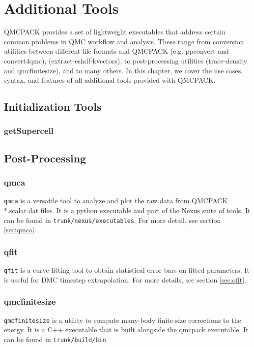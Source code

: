 \chapter{Additional Tools}
\label{chap:additional_tools}
QMCPACK provides a set of lightweight executables that address certain
common problems in QMC workflow and analysis.  These range from conversion utilities between 
different file formats and QMCPACK (e.g. ppconvert and convert4qmc),  
(extract-eshdf-kvectors), to post-processing utilities (trace-density and qmcfinitesize), and to many others.  In this chapter, we cover the use cases, syntax, and features of all additional tools provided with QMCPACK.  

\section{Initialization Tools}
  \subsection{getSupercell}

\section{Post-Processing}
  \subsection{qmca}
    \texttt{qmca} is a versatile tool to analyze and plot the raw data from QMCPACK *.scalar.dat files.
    It is a python executable and part of the Nexus suite of tools.  It can be found in 
    \texttt{trunk/nexus/executables}. For more detail, see section \ref{sec:qmca}.
  \subsection{qfit}
    \texttt{qfit} is a curve fitting tool to obtain statistical error bars on fitted parameters.
    It is useful for DMC timestep extrapolation.  For more details, see section \ref{sec:qfit}.
  \subsection{qmcfinitesize}
    \texttt{qmcfinitesize} is a utility to compute many-body finite-size corrections to the energy.  It
    is a C++ executable that is built alongside the qmcpack executable.  It can be found in 
    \texttt{trunk/build/bin}

